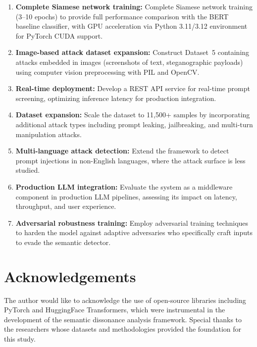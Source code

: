 \documentclass[11pt]{article}
\begin{document}
\begin{enumerate}[leftmargin=*]
  \item \textbf{Complete Siamese network training:} Complete Siamese network training (3--10 epochs) to provide full performance comparison with the BERT baseline classifier, with GPU acceleration via Python 3.11/3.12 environment for PyTorch CUDA support.
  \item \textbf{Image-based attack dataset expansion:} Construct Dataset~5 containing attacks embedded in images (screenshots of text, steganographic payloads) using computer vision preprocessing with PIL and OpenCV.
  \item \textbf{Real-time deployment:} Develop a REST API service for real-time prompt screening, optimizing inference latency for production integration.
  \item \textbf{Dataset expansion:} Scale the dataset to 11,500+ samples by incorporating additional attack types including prompt leaking, jailbreaking, and multi-turn manipulation attacks.
  \item \textbf{Multi-language attack detection:} Extend the framework to detect prompt injections in non-English languages, where the attack surface is less studied.
  \item \textbf{Production LLM integration:} Evaluate the system as a middleware component in production LLM pipelines, assessing its impact on latency, throughput, and user experience.
  \item \textbf{Adversarial robustness training:} Employ adversarial training techniques to harden the model against adaptive adversaries who specifically craft inputs to evade the semantic detector.
\end{enumerate}

\section*{Acknowledgements}

The author would like to acknowledge the use of open-source libraries including PyTorch and HuggingFace Transformers, which were instrumental in the development of the semantic dissonance analysis framework. Special thanks to the researchers whose datasets and methodologies provided the foundation for this study.



\end{document}
